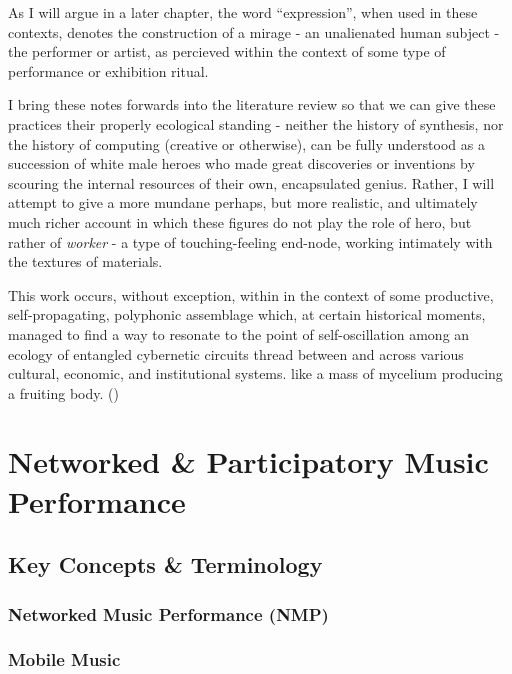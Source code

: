 \documentclass[
  american,
  12pt,
]{article}
\begin{document}
As I will argue in a later chapter, the word ``expression'', when used
in these contexts, denotes the construction of a mirage - an unalienated
human subject - the performer or artist, as percieved within the context
of some type of performance or exhibition ritual.

I bring these notes forwards into the literature review so that we can
give these practices their properly ecological standing - neither the
history of synthesis, nor the history of computing (creative or
otherwise), can be fully understood as a succession of white male heroes
who made great discoveries or inventions by scouring the internal
resources of their own, encapsulated genius. Rather, I will attempt to
give a more mundane perhaps, but more realistic, and ultimately much
richer account in which these figures do not play the role of hero, but
rather of \emph{worker} - a type of touching-feeling end-node, working
intimately with the textures of materials.

This work occurs, without exception, within in the context of some
productive, self-propagating, polyphonic assemblage which, at certain
historical moments, managed to find a way to resonate to the point of
self-oscillation among an ecology of entangled cybernetic circuits
thread between and across various cultural, economic, and institutional
systems. like a mass of mycelium producing a fruiting body.
()

\setcounter{section}{0}

\section{Networked \& Participatory Music
Performance}\label{networked-participatory-music-performance}

\subsection{Key Concepts \& Terminology}\label{key-concepts-terminology}

\subsubsection{Networked Music Performance
(NMP)}\label{networked-music-performance-nmp}

\subsubsection{Mobile Music}\label{mobile-music}
\end{document}
